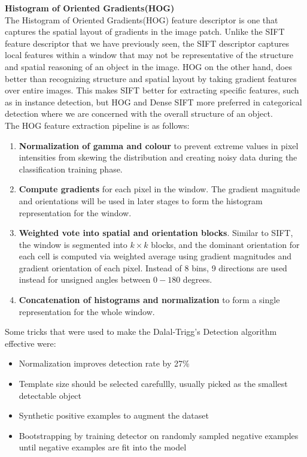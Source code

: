 \documentclass[12pt]{article}
\begin{document}
\textbf{Histogram of Oriented Gradients(HOG)}\\

The Histogram of Oriented Gradients(HOG) feature descriptor is one that captures the spatial layout of gradients in the image patch. Unlike the SIFT feature descriptor that we have previously seen, the SIFT descriptor captures local features within a window that may not be representative of the structure and spatial reasoning of an object in the image. HOG on the other hand, does better than recognizing structure and spatial layout by taking gradient features over entire images. This makes SIFT better for extracting specific features, such as in instance detection, but HOG and Dense SIFT more preferred in categorical detection where we are concerned with the overall structure of an object.\\

The HOG feature extraction pipeline is as follows:

\begin{enumerate}
\item \textbf{Normalization of gamma and colour} to prevent extreme values in pixel intensities from skewing the distribution and creating noisy data during the classification training phase.
\item \textbf{Compute gradients} for each pixel in the window. The gradient magnitude and orientations will be used in later stages to form the histogram representation for the window.
\item \textbf{Weighted vote into spatial and orientation blocks}. Similar to SIFT, the window is segmented into $k \times k$ blocks, and the dominant orientation for each cell is computed via weighted average using gradient magnitudes and gradient orientation of each pixel. Instead of 8 bins, 9 directions are used instead for unsigned angles between $0-180$ degrees.
\item \textbf{Concatenation of histograms and normalization} to form a single representation for the whole window.
\end{enumerate}

Some tricks that were used to make the Dalal-Trigg's Detection algorithm effective were:
\begin{itemize}
\item Normalization improves detection rate by 27\%
\item Template size should be selected carefullly, usually picked as the smallest detectable object
\item Synthetic positive examples to augment the dataset
\item Bootstrapping by training detector on randomly sampled negative examples until negative examples are fit into the model
\end{itemize}
\end{document}
